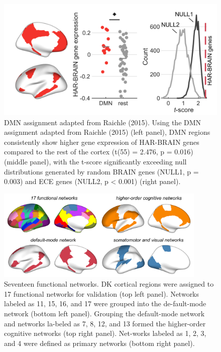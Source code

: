 \begin{refsection}
\begin{figure}[H]
    \centering
    \includegraphics[width=12cm]{images/harFigS10.png}
    \caption{DMN assignment adapted from Raichle (2015). Using the DMN assignment adapted from Raichle (2015) (left panel), DMN regions consistently show higher gene expression of HAR-BRAIN genes compared to the rest of the cortex (t(55) = 2.476, p = 0.016) (middle panel), with the t-score significantly exceeding null distributions generated by random BRAIN genes (NULL1, p = 0.003) and ECE genes (NULL2, p < 0.001) (right panel).}
    \label{harFigs10}
\end{figure}

\begin{figure}[H]
    \centering
    \includegraphics[width=10cm]{images/harFigS11.png}
    \caption{Seventeen functional networks. DK cortical regions were assigned to 17 functional networks for validation (top left panel). Networks labeled as 11, 15, 16, and 17 were grouped into the de-fault-mode network (bottom left panel). Grouping the default-mode network and networks la-beled as 7, 8, 12, and 13 formed the higher-order cognitive networks (top right panel). Net-works labeled as 1, 2, 3, and 4 were defined as primary networks (bottom right panel).}
    \label{harFigs11}
\end{figure}


\end{refsection}
